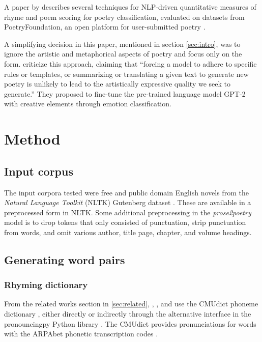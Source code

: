 \documentclass[11pt,a4paper]{article}
\begin{document}
A paper by \citet{keswarani} describes several techniques for NLP-driven quantitative measures of rhyme and poem scoring for poetry classification, evaluated on datasets from PoetryFoundation, an open platform for user-submitted poetry \cite*{poetryfoundation}.

A simplifying decision in this paper, mentioned in section \ref{sec:intro}, was to ignore the artistic and metaphorical aspects of poetry and focus only on the form. \citet{bena2020introducing} criticize this approach, claiming that ``forcing a model to adhere to specific rules or templates, or summarizing or translating a given text to generate new poetry is unlikely to lead to the artistically expressive quality we seek to generate.'' They proposed to fine-tune the pre-trained language model GPT-2 with creative elements through emotion classification.

\section{Method}
\label{sec:method}

\subsection{Input corpus}

The input corpora tested were free and public domain English novels from the \textit{Natural Language Toolkit} (NLTK) Gutenberg dataset \cite[Chapter~2]{gutenbergnltk}. These are available in a preprocessed form in NLTK. Some additional preprocessing in the \textit{prose2poetry} model is to drop tokens that only consisted of punctuation, strip punctuation from words, and omit various author, title page, chapter, and volume headings.

\subsection{Generating word pairs}

\subsubsection{Rhyming dictionary}

From the related works section in \ref{sec:related}, \citet{keswarani}, \citet{cole}, and \citet{hopkins-kiela-2017} use the CMUdict phoneme dictionary \cite{cmudict}, either directly or indirectly through the alternative interface in the pronouncingpy Python library \cite{pronouncingpy}. The CMUdict provides pronunciations for words with the ARPAbet phonetic transcription codes \cite[Chapter~27]{jurafsky}.
\end{document}

